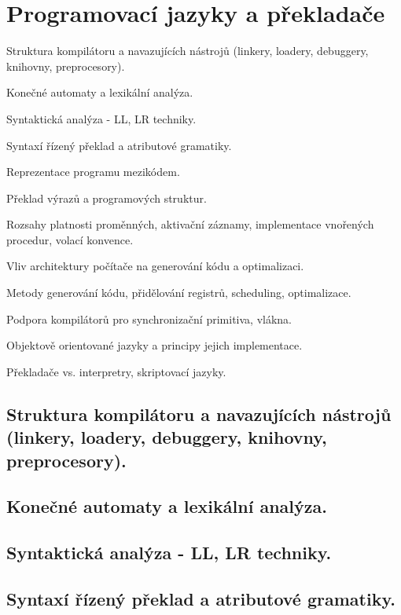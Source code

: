 \newpage
\section{Programovací jazyky a překladače}
\begin{pozadavky}
\begin{pitemize}
\item Struktura kompilátoru a navazujících nástrojů (linkery, loadery, debuggery, knihovny, preprocesory).
\item Konečné automaty a lexikální analýza.
\item Syntaktická analýza - LL, LR techniky.
\item Syntaxí řízený překlad a atributové gramatiky.
\item Reprezentace programu mezikódem.
\item Překlad výrazů a programových struktur.
\item Rozsahy platnosti proměnných, aktivační záznamy, implementace vnořených procedur, volací konvence.
\item Vliv architektury počítače na generování kódu a optimalizaci.
\item Metody generování kódu, přidělování registrů, scheduling, optimalizace.
\item Podpora kompilátorů pro synchronizační primitiva, vlákna.
\item Objektově orientované jazyky a principy jejich implementace.
\item Překladače vs. interpretry, skriptovací jazyky.
\end{pitemize}
\end{pozadavky}

\subsection{Struktura kompilátoru a navazujících nástrojů (linkery, loadery, debuggery, knihovny, preprocesory).}
\subsection{Konečné automaty a lexikální analýza.}
\subsection{Syntaktická analýza - LL, LR techniky.}
\subsection{Syntaxí řízený překlad a atributové gramatiky.}
